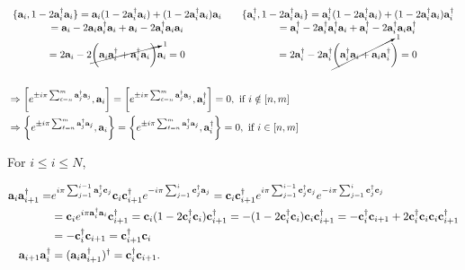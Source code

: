 \documentclass{homework}
\begin{document}
\begin{equation}
\begin{split}
&\begin{array}{ccc}
     \{{\bf a}_i, 1 - 2{\bf a}_i^\dagger {\bf a}_i\} = {\bf a}_i (1-2{\bf a}_i^\dagger {\bf a}_i) + (1-2{\bf a}_i^\dagger {\bf a}_i) {\bf a}_i &  & \{{\bf a}_i^\dagger, 1 - 2{\bf a}_i^\dagger {\bf a}_i\} = {\bf a}_i^\dagger (1-2{\bf a}_i^\dagger {\bf a}_i) + (1-2{\bf a}_i^\dagger {\bf a}_i) {\bf a}_i^\dagger \\
     = {\bf a}_i - 2 {\bf a}_i {\bf a}_i^\dagger {\bf a}_i + {\bf a}_i - 2 {\bf a}_i^\dagger {\bf a}_i {\bf a}_i & & = {\bf a}_i^\dagger - 2 {\bf a}_i^\dagger {\bf a}_i^\dagger {\bf a}_i + {\bf a}_i^\dagger - 2 {\bf a}_i^\dagger {\bf a}_i {\bf a}_i^\dagger \\
     = 2{\bf a}_i - 2 \cancelto{1}{\bigg({\bf a}_i {\bf a}_i^\dagger + {\bf a}_i^\dagger {\bf a}_i\bigg)} {\bf a}_i = 0 &  & = 2{\bf a}_i^\dagger - 2 {\bf a}_i^\dagger \cancelto{1}{\bigg( {\bf a}_i^\dagger {\bf a}_i + {\bf a}_i {\bf a}_i^\dagger}\bigg) = 0
\end{array} \\
\\
&\Rightarrow \bigg[e^{\pm i \pi \sum_{\ell = n}^{m} {\bf a}_j^\dagger {\bf a}_j}, {\bf a}_i\bigg] = \bigg[e^{\pm i \pi \sum_{\ell = n}^{m} {\bf a}_j^\dagger {\bf a}_j}, {\bf a}_i^\dagger\bigg] = 0, \textnormal{ if } i \notin [n, m] \\
&\Rightarrow \bigg\{e^{\pm i \pi \sum_{\ell = n}^{m} {\bf a}_j^\dagger {\bf a}_j}, {\bf a}_i\bigg\} = \bigg\{e^{\pm i \pi \sum_{\ell = n}^{m} {\bf a}_j^\dagger {\bf a}_j}, {\bf a}_i^\dagger\bigg\} = 0, \textnormal{ if } i \in [n, m]
\end{split}
\end{equation}

For $i \leq i \leq N$,

\begin{equation}
    \begin{split}
{\bf a}_i {\bf a}_{i+1}^\dagger =& e^{i\pi \sum_{j=1}^{i-1} {\bf a}_j^\dagger {\bf c}_j} {\bf c}_i  {\bf c}_{i+1}^\dagger e^{-i\pi \sum_{j=1}^{i} {\bf c}_j^\dagger {\bf a}_j} = {\bf c}_i  {\bf c}_{i+1}^\dagger e^{i\pi \sum_{j=1}^{i-1} {\bf c}_j^\dagger {\bf c}_j} e^{-i\pi \sum_{j=1}^{i} {\bf c}_j^\dagger {\bf c}_j} \\
        &= {\bf c}_i e^{i \pi {\bf a}_i^\dagger {\bf a}_i} {\bf c}_{i+1}^\dagger = {\bf c}_i (1- 2{\bf c}_i^\dagger {\bf c}_i){\bf c}_{i+1}^\dagger = -(1- 2{\bf c}_i^\dagger {\bf c}_i) {\bf c}_i {\bf c}_{i+1}^\dagger = -{\bf c}_i^\dagger {\bf c}_{i+1} + 2{\bf c}_i^\dagger {\bf c}_i {\bf c}_i {\bf c}_{i+1}^\dagger  \\
        &= -{\bf c}_i^\dagger {\bf c}_{i+1} = {\bf c}_{i+1}^\dagger {\bf c}_{i} \\
        {\bf a}_{i+1} {\bf a}_{i}^\dagger &= ({\bf a}_i {\bf a}_{i+1}^\dagger)^\dagger = {\bf c}_i^\dagger {\bf c}_{i+1}.
    \end{split}
\end{equation}
\end{document}
